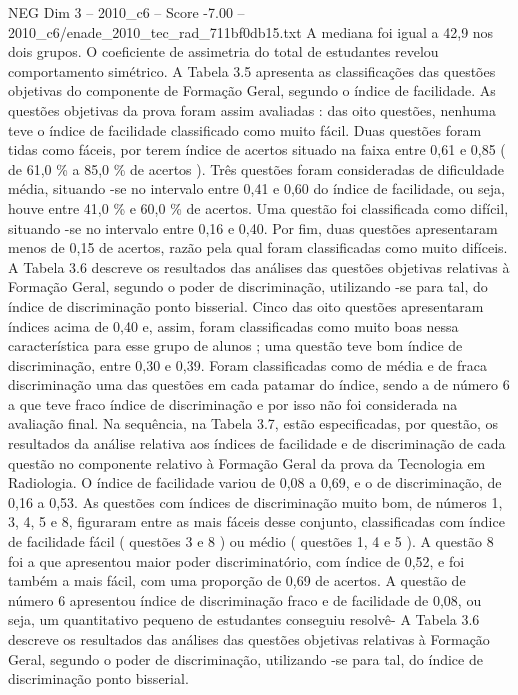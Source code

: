 \begin{textsample}{NEG Dim 3 – 2010\_c6 – Score -7.00 – 2010\_c6/enade\_2010\_tec\_rad\_711bf0db15.txt}
A mediana foi igual a 42,9 nos dois grupos.
O coeficiente de assimetria do total de estudantes revelou comportamento simétrico.
A Tabela 3.5 apresenta as classificações das questões objetivas do componente de Formação Geral, segundo o índice de facilidade.
As questões objetivas da prova foram assim avaliadas : das oito questões, nenhuma teve o índice de facilidade classificado como muito fácil.
Duas questões foram tidas como fáceis, por terem índice de acertos situado na faixa entre 0,61 e 0,85 ( de 61,0 \% a 85,0 \% de acertos ).
Três questões foram consideradas de dificuldade média, situando -se no intervalo entre 0,41 e 0,60 do índice de facilidade, ou seja, houve entre 41,0 \% e 60,0 \% de acertos.
Uma questão foi classificada como difícil, situando -se no intervalo entre 0,16 e 0,40.
Por fim, duas questões apresentaram menos de 0,15 de acertos, razão pela qual foram classificadas como muito difíceis.
A Tabela 3.6 descreve os resultados das análises das questões objetivas relativas à Formação Geral, segundo o poder de discriminação, utilizando -se para tal, do índice de discriminação ponto bisserial.
Cinco das oito questões apresentaram índices acima de 0,40 e, assim, foram classificadas como muito boas nessa característica para esse grupo de alunos ; uma questão teve bom índice de discriminação, entre 0,30 e 0,39.
Foram classificadas como de média e de fraca discriminação uma das questões em cada patamar do índice, sendo a de número 6 a que teve fraco índice de discriminação e por isso não foi considerada na avaliação final.
Na sequência, na Tabela 3.7, estão especificadas, por questão, os resultados da análise relativa aos índices de facilidade e de discriminação de cada questão no componente relativo à Formação Geral da prova da Tecnologia em Radiologia.
O índice de facilidade variou de 0,08 a 0,69, e o de discriminação, de 0,16 a 0,53.
As questões com índices de discriminação muito bom, de números 1, 3, 4, 5 e 8, figuraram entre as mais fáceis desse conjunto, classificadas com índice de facilidade fácil ( questões 3 e 8 ) ou médio ( questões 1, 4 e 5 ).
A questão 8 foi a que apresentou maior poder discriminatório, com índice de 0,52, e foi também a mais fácil, com uma proporção de 0,69 de acertos.
A questão de número 6 apresentou índice de discriminação fraco e de facilidade de 0,08, ou seja, um quantitativo pequeno de estudantes conseguiu resolvê- A Tabela 3.6 descreve os resultados das análises das questões objetivas relativas à Formação Geral, segundo o poder de discriminação, utilizando -se para tal, do índice de discriminação ponto bisserial.

\end{textsample}
